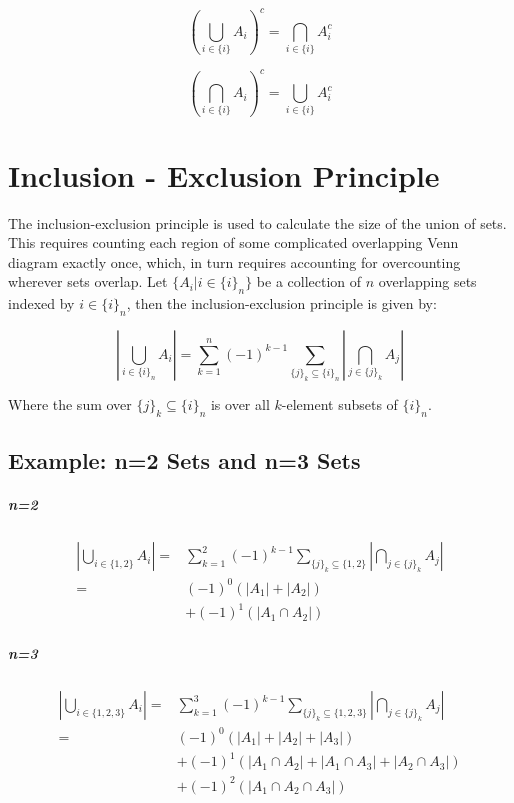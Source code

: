 \begin{equation}
\left(\bigcup_{i\in\{i\}}A_i\right)^c = \bigcap_{i\in\{i\}}A^c_i
\end{equation}

\begin{equation}
\left(\bigcap_{i\in\{i\}}A_i\right)^c = \bigcup_{i\in\{i\}}A^c_i
\end{equation}


\section{Inclusion - Exclusion Principle}
\label{sec:inclusionexclusion}

The inclusion-exclusion principle is used to calculate the size of the union of sets. This requires counting each region of some complicated overlapping Venn diagram exactly once, which, in turn requires accounting for overcounting wherever sets overlap. Let $\{A_i | i\in \{i\}_n \}$ be a collection of $n$ overlapping sets indexed by $i\in \{i\}_n$, then the inclusion-exclusion principle is given by:

\begin{equation}
\left|\bigcup_{i\in\{i\}_n} A_i\right| = \sum^n_{k=1} (-1)^{k-1} \sum_{\{j\}_k \subseteq \{i\}_n} \left|\bigcap_{j\in\{j\}_k} A_j\right|
\end{equation}


Where the sum over $\{j\}_k \subseteq \{i\}_n$ is over all $k$-element subsets of $\{i\}_n$.

\subsection{Example: n=2 Sets and n=3 Sets}

\subparagraph{n=2}
\begin{equation}
\begin{array}{rl}
\left|\bigcup_{i\in\{1,2\}}A_i\right| =&  \sum^2_{k=1} (-1)^{k-1} \sum_{\{j\}_k \subseteq \{1,2\}} \left|\bigcap_{j\in\{j\}_k} A_j\right|\\
=&(-1)^{0}\left(|A_1| + |A_2|\right) \\
&+ (-1)^{1}\left(|A_1 \cap A_2| \right)
\end{array}
\end{equation}


\subparagraph{n=3}
\begin{equation}
\begin{array}{rl}
\left|\bigcup_{i\in\{1,2,3\}}A_i\right| =&  \sum^3_{k=1} (-1)^{k-1} \sum_{\{j\}_k \subseteq \{1,2,3\}} \left|\bigcap_{j\in\{j\}_k} A_j\right|\\
=&(-1)^{0}\left(|A_1| + |A_2| + |A_3|\right) \\
&+ (-1)^{1}\left(|A_1 \cap A_2|  + |A_1 \cap A_3| + |A_2 \cap A_3|  \right) \\ 
&+ (-1)^{2}\left(|A_1 \cap A_2 \cap A_3|   \right)
\end{array}
\end{equation}

